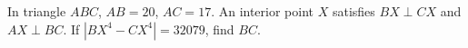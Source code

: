 In triangle $ ABC $, $ AB=20 $, $ AC=17 $. An interior point $ X $ satisfies $ BX\perp CX $ and $ AX\perp BC $. If $|BX^4-CX^4|=32079 $, find $ BC $.
